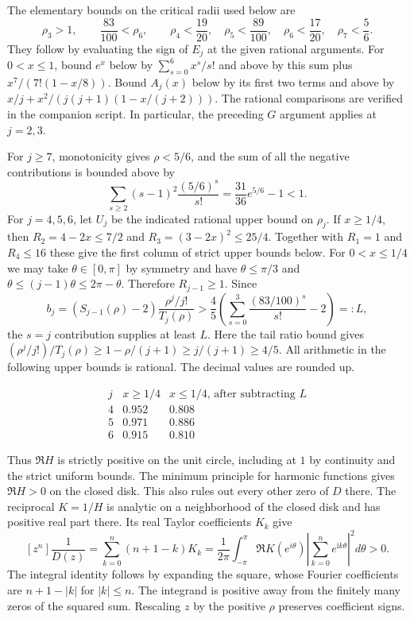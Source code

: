\documentclass[11pt]{article}
\begin{document}
The elementary bounds on the critical radii used below are
\[
\rho_3>1,\qquad \frac{83}{100}<\rho_6,\qquad
\rho_4<\frac{19}{20},\quad \rho_5<\frac{89}{100},\quad
\rho_6<\frac{17}{20},\quad \rho_7<\frac56.
\]
They follow by evaluating the sign of $E_j$ at the given rational arguments. For $0<x\le1$, bound $e^x$ below by $\sum_{s=0}^6 x^s/s!$ and above by this sum plus $x^7/(7!(1-x/8))$. Bound $A_j(x)$ below by its first two terms and above by $x/j+x^2/(j(j+1)(1-x/(j+2)))$. The rational comparisons are verified in the companion script. In particular, the preceding $G$ argument applies at $j=2,3$.

For $j\ge7$, monotonicity gives $\rho<5/6$, and the sum of all the negative contributions is bounded above by
\[
\sum_{s\ge2}(s-1)^2\frac{(5/6)^s}{s!}
=\frac{31}{36}e^{5/6}-1<1.
\]
For $j=4,5,6$, let $U_j$ be the indicated rational upper bound on $\rho_j$. If $x\ge1/4$, then $R_2=4-2x\le7/2$ and $R_3=(3-2x)^2\le25/4$. Together with $R_1=1$ and $R_4\le16$ these give the first column of strict upper bounds below. For $0<x\le1/4$ we may take $\theta\in[0,\pi]$ by symmetry and have $\theta\le\pi/3$ and $\theta\le(j-1)\theta\le2\pi-\theta$. Therefore $R_{j-1}\ge1$. Since
\[
b_j=(S_{j-1}(\rho)-2)\frac{\rho^j/j!}{T_j(\rho)}
>\frac45\left(\sum_{s=0}^3\frac{(83/100)^s}{s!}-2\right)=:L,
\]
the $s=j$ contribution supplies at least $L$. Here the tail ratio bound gives $(\rho^j/j!)/T_j(\rho)\ge1-\rho/(j+1)\ge j/(j+1)\ge4/5$. All arithmetic in the following upper bounds is rational. The decimal values are rounded up.

\[
\begin{array}{c|cc}
 j & x\ge1/4 & x\le1/4\text{, after subtracting }L\\ \hline
 4 & 0.952 & 0.808\\
 5 & 0.971 & 0.886\\
 6 & 0.915 & 0.810
\end{array}
\]

Thus $\Re H$ is strictly positive on the unit circle, including at $1$ by continuity and the strict uniform bounds. The minimum principle for harmonic functions gives $\Re H>0$ on the closed disk. This also rules out every other zero of $D$ there. The reciprocal $K=1/H$ is analytic on a neighborhood of the closed disk and has positive real part there. Its real Taylor coefficients $K_k$ give
\[
[z^n]\frac{1}{D(z)}
=\sum_{k=0}^n(n+1-k)K_k
=\frac{1}{2\pi}\int_{-\pi}^{\pi}\Re K(e^{i\theta})
  \left|\sum_{k=0}^n e^{\mathrm{i}k\theta}\right|^2 d\theta>0.
\]
The integral identity follows by expanding the square, whose Fourier coefficients are $n+1-|k|$ for $|k|\le n$. The integrand is positive away from the finitely many zeros of the squared sum. Rescaling $z$ by the positive $\rho$ preserves coefficient signs.
\end{document}
